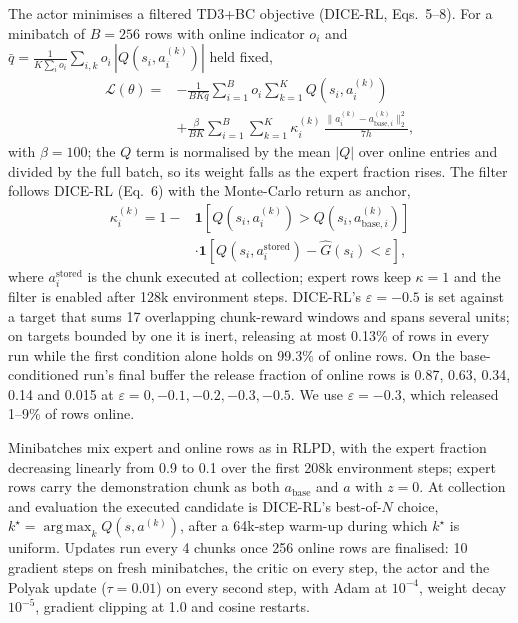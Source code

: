 \documentclass[10pt,twocolumn]{article}
\DeclareMathOperator*{\argmax}{arg\,max}
\begin{document}
The actor minimises a filtered TD3+BC objective (DICE-RL, Eqs.~5--8). For a minibatch of $B = 256$ rows with online indicator $o_i$ and $\bar q = \frac{1}{K \sum_i o_i} \sum_{i,k} o_i \,|Q(s_i, a^{(k)}_i)|$ held fixed,
\begin{equation}
\begin{split}
\mathcal{L}(\theta) = {}& -\frac{1}{B K \bar q} \sum_{i=1}^{B} o_i \sum_{k=1}^{K} Q\!\left(s_i, a^{(k)}_i\right) \\
& + \frac{\beta}{B K} \sum_{i=1}^{B} \sum_{k=1}^{K} \kappa^{(k)}_i\, \frac{\bigl\| a^{(k)}_i - a^{(k)}_{\mathrm{base},i} \bigr\|_2^2}{7h},
\end{split}
\label{eq:actor}
\end{equation}
with $\beta = 100$; the $Q$ term is normalised by the mean $|Q|$ over online entries and divided by the full batch, so its weight falls as the expert fraction rises. The filter follows DICE-RL (Eq.~6) with the Monte-Carlo return as anchor,
\begin{equation}
\begin{split}
\kappa^{(k)}_i = 1 - {}& \mathbf{1}\!\left[Q(s_i, a^{(k)}_i) > Q(s_i, a^{(k)}_{\mathrm{base},i})\right] \\
& \cdot \mathbf{1}\!\left[Q(s_i, a^{\mathrm{stored}}_i) - \hat G(s_i) < \varepsilon\right],
\end{split}
\label{eq:filter}
\end{equation}
where $a^{\mathrm{stored}}_i$ is the chunk executed at collection; expert rows keep $\kappa = 1$ and the filter is enabled after 128k environment steps. DICE-RL's $\varepsilon = -0.5$ is set against a target that sums 17 overlapping chunk-reward windows and spans several units; on targets bounded by one it is inert, releasing at most 0.13\% of rows in every run while the first condition alone holds on 99.3\% of online rows. On the base-conditioned run's final buffer the release fraction of online rows is 0.87, 0.63, 0.34, 0.14 and 0.015 at $\varepsilon = 0, -0.1, -0.2, -0.3, -0.5$. We use $\varepsilon = -0.3$, which released 1--9\% of rows online.

Minibatches mix expert and online rows as in RLPD, with the expert fraction decreasing linearly from 0.9 to 0.1 over the first 208k environment steps; expert rows carry the demonstration chunk as both $a_{\mathrm{base}}$ and $a$ with $z = 0$. At collection and evaluation the executed candidate is DICE-RL's best-of-$N$ choice, $k^\star = \argmax_k Q(s, a^{(k)})$, after a 64k-step warm-up during which $k^\star$ is uniform. Updates run every 4 chunks once 256 online rows are finalised: 10 gradient steps on fresh minibatches, the critic on every step, the actor and the Polyak update ($\tau = 0.01$) on every second step, with Adam at $10^{-4}$, weight decay $10^{-5}$, gradient clipping at 1.0 and cosine restarts.
\end{document}
